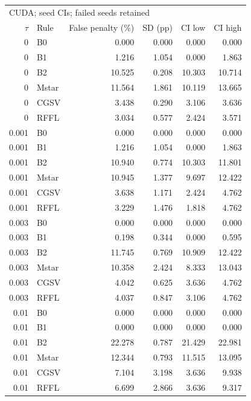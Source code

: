 \begin{tabular}{rlrrrr}
\toprule
\multicolumn{6}{l}{CUDA; seed CIs; failed seeds retained} \\
$\tau$ & Rule & False penalty (\%) & SD (pp) & CI low & CI high \\
\midrule
0 & B0 & 0.000 & 0.000 & 0.000 & 0.000 \\
0 & B1 & 1.216 & 1.054 & 0.000 & 1.863 \\
0 & B2 & 10.525 & 0.208 & 10.303 & 10.714 \\
0 & Mstar & 11.564 & 1.861 & 10.119 & 13.665 \\
0 & CGSV & 3.438 & 0.290 & 3.106 & 3.636 \\
0 & RFFL & 3.034 & 0.577 & 2.424 & 3.571 \\
0.001 & B0 & 0.000 & 0.000 & 0.000 & 0.000 \\
0.001 & B1 & 1.216 & 1.054 & 0.000 & 1.863 \\
0.001 & B2 & 10.940 & 0.774 & 10.303 & 11.801 \\
0.001 & Mstar & 10.945 & 1.377 & 9.697 & 12.422 \\
0.001 & CGSV & 3.638 & 1.171 & 2.424 & 4.762 \\
0.001 & RFFL & 3.229 & 1.476 & 1.818 & 4.762 \\
0.003 & B0 & 0.000 & 0.000 & 0.000 & 0.000 \\
0.003 & B1 & 0.198 & 0.344 & 0.000 & 0.595 \\
0.003 & B2 & 11.745 & 0.769 & 10.909 & 12.422 \\
0.003 & Mstar & 10.358 & 2.424 & 8.333 & 13.043 \\
0.003 & CGSV & 4.042 & 0.625 & 3.636 & 4.762 \\
0.003 & RFFL & 4.037 & 0.847 & 3.106 & 4.762 \\
0.01 & B0 & 0.000 & 0.000 & 0.000 & 0.000 \\
0.01 & B1 & 0.000 & 0.000 & 0.000 & 0.000 \\
0.01 & B2 & 22.278 & 0.787 & 21.429 & 22.981 \\
0.01 & Mstar & 12.344 & 0.793 & 11.515 & 13.095 \\
0.01 & CGSV & 7.104 & 3.198 & 3.636 & 9.938 \\
0.01 & RFFL & 6.699 & 2.866 & 3.636 & 9.317 \\
\bottomrule
\end{tabular}

